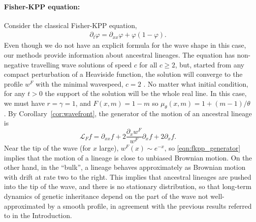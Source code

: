 \documentclass[12pt]{article}
\newcommand{\Lgen}{\mathcal{L}}    %
\numberwithin{equation}{section}
\begin{document}

\paragraph{Fisher-KPP equation:}
Consider the classical Fisher-KPP equation,
\begin{align} \label{eqn:fkpp}
    \partial_t\varphi = \partial_{xx}\varphi + \varphi (1-\varphi) .
\end{align}
Even though we do not have an explicit formula for the wave shape in this case,
our methods provide information about ancestral lineages.
The equation has non-negative travelling wave solutions of 
speed $c$ for all $c \geq 2$, 
but, started from any compact perturbation of a Heaviside function, the 
solution will converge to the profile $w^F$ with the minimal wavespeed, $c=2$
\citep{kolmogorov/petrovsky/piscounov:1937,fife1977approach,bramson:1983}.
No matter what initial condition,
for any $t>0$ the support of the 
solution will be the whole real line. 
In this case, we must have $r = \gamma = 1$,
and $F(x, m) = 1 - m$ so $\mu_\theta(x, m) = 1 + (m-1)/\theta$.
By Corollary~\ref{cor:wavefront},
the generator of the motion of an ancestral lineage is
\begin{equation} \label{eqn:fkpp_generator}
    \Lgen_F  f
    =
    \partial_{xx}f + 2 \frac{\partial_xw^F}{w^F} \partial_x f + 2 \partial_xf .
\end{equation}
Near the tip of the wave (for $x$ large), $w^F(x) \sim e^{-x}$,
so \eqref{eqn:fkpp_generator} implies that
the motion of a lineage is close to unbiased Brownian motion.
On the other hand, in the ``bulk'', %
a lineage behaves approximately as
Brownian motion with drift at rate two to the right.
This implies that
ancestral lineages are pushed into the tip of the wave,
and there is no stationary distribution,
so that long-term dynamics of genetic inheritance
depend on the part of the wave not well-approximated by a smooth profile,
in agreement with the previous results referred to in the Introduction.


\end{document}
